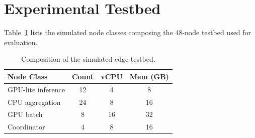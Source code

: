 \section{Experimental Testbed}

Table~\ref{tab:testbed} lists the simulated node classes composing the
48-node testbed used for evaluation.

\begin{table}[h]
\centering
\caption{Composition of the simulated edge testbed.}
\label{tab:testbed}
\begin{tabular}{@{}lccc@{}}
\toprule
\textbf{Node Class} & \textbf{Count} & \textbf{vCPU} & \textbf{Mem (GB)}\\
\midrule
GPU-lite inference & 12 & 4 & 8\\
CPU aggregation & 24 & 8 & 16\\
GPU batch & 8 & 16 & 32\\
Coordinator & 4 & 8 & 16\\
\bottomrule
\end{tabular}
\end{table}
